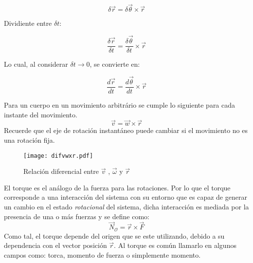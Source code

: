 \documentclass[/home/hernan/Documentos/Apuntes_mecanica_teorica/main.tex]{subfiles}
\begin{document}
	\begin{equation*}
		\delta \vec{r} = \delta \vec{\theta} \times \vec{r}
	\end{equation*}

	Dividiente entre $\delta t$:

	\begin{equation*}
		\frac{\delta \vec{r}}{\delta t} =\frac{\delta \vec{\theta}}{\delta t}  \times \vec{r}
	\end{equation*}

	Lo cual, al considerar $\delta t \rightarrow 0$, se convierte en:

	\begin{equation*}
		\frac{d \vec{r}}{dt} = \frac{d \vec{\theta}}{dt} \times \vec{r}
	\end{equation*}

	\begin{definition}
		Para un cuerpo en un movimiento arbitrário se cumple lo siguiente para cada instante del movimiento.
		\begin{equation}
			\vec{v} = \vec{w} \times \vec{r}
			\label{eq: vwrelation}
		\end{equation}
		Recuerde que el eje de rotación instantáneo puede cambiar si el movimiento no es una rotación fija.
	\end{definition}


	\begin{marginfigure}
		\begin{figure}[H]
			\texttt{[image: difvwxr.pdf]}
			\caption{Relación diferencial entre $\vec{v}$ , $\vec{\omega}$ y $\vec{r}$}
			\label{fig: difvwxr}
		\end{figure}
	\end{marginfigure}

	\begin{definition}
		El torque es el análogo de la fuerza para las rotaciones. Por lo que el torque corresponde a una interacción del sistema con su entorno que es capaz de generar un cambio en el estado \textit{rotacional} del sistema, dicha interacción es mediada por la presencia de una o más fuerzas y se define como:
		\begin{equation}
			\vec{N}_{\mathcal{O}} = \vec{r} \times \vec{F}
			\label{eq: torque}
		\end{equation}
		Como tal, el torque depende del origen que se este utilizando, debido a su dependencia con el vector posición $\vec{r}$. Al torque es común llamarlo en algunos campos como: torca, momento de fuerza o simplemente momento.
	\end{definition}
\end{document}
